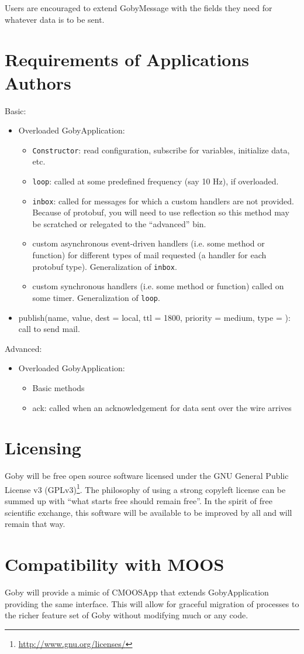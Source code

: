 \documentclass[10pt,letterpaper]{article}
\begin{document}
Users are encouraged to extend GobyMessage with the fields they need for whatever data is to be sent.

\section{Requirements of Applications Authors}

Basic:
\begin{itemize}
\item Overloaded GobyApplication:
\begin{itemize}
\item \texttt{Constructor}: read configuration, subscribe for variables, initialize data, etc.
\item \texttt{loop}: called at some predefined frequency (say 10 Hz), if overloaded.
\item \texttt{inbox}: called for messages for which a custom handlers are not provided. Because of protobuf, you will need to use reflection so this method may be scratched or relegated to the ``advanced'' bin.
\item custom asynchronous event-driven handlers (i.e. some method or function) for different types of mail requested (a handler for each protobuf type). Generalization of \texttt{inbox}.
\item custom synchronous handlers (i.e. some method or function) called on some timer. Generalization of \texttt{loop}.
\end{itemize}
\item publish(name, value, dest = local, ttl = 1800, priority = medium, type = ): call to send mail.
\end{itemize}

Advanced:
\begin{itemize}
\item Overloaded GobyApplication:
\begin{itemize}
\item Basic methods
\item ack: called when an acknowledgement for data sent over the wire arrives
\end{itemize}
\end{itemize}



\section{Licensing}
Goby will be free open source software licensed under the GNU General Public License v3 (GPLv3)\footnote{\url{http://www.gnu.org/licenses/}}. The philosophy of using a strong copyleft license can be summed up with ``what starts free should remain free''. In the spirit of free scientific exchange, this software will be available to be improved by all and will remain that way.

\section{Compatibility with MOOS}
Goby will provide a mimic of CMOOSApp that extends GobyApplication providing the same interface. This will allow for graceful migration of processes to the richer feature set of Goby without modifying much or any code.
\end{document}
